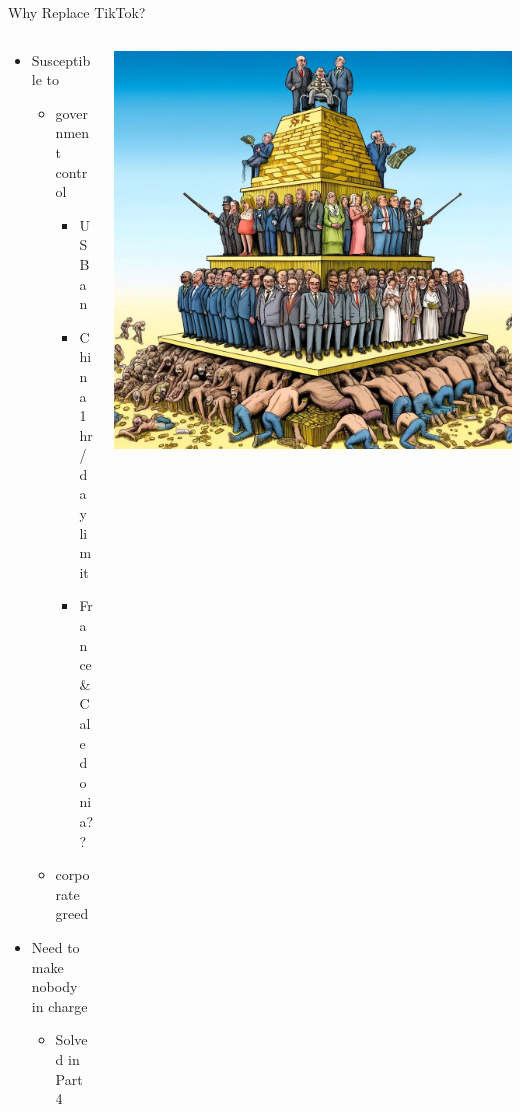 \documentclass[aspectratio=169]{beamer}
\begin{document}
\begin{frame}{Why Replace TikTok?}
\begin{columns}[T]
    \begin{column}[T]{0.5\textwidth}
        \begin{itemize}
            \item Susceptible to 
            \begin{itemize}
                \item government control 
                \begin{itemize}
                    \item US Ban 
                    \item China 1hr/day limit
                    \item France \& Caledonia??
                \end{itemize}
                \item corporate greed
            \end{itemize}
            \item Need to make nobody in charge
            \begin{itemize}
                \item Solved in Part 4
            \end{itemize}
        \end{itemize}
    \end{column}
    \begin{column}{0.5\textwidth}
        \includegraphics[height=0.8\textheight]{imgs/why_replace/power_pyramid.jpeg}
    \end{column}
\end{columns}
\end{frame}
\end{document}
